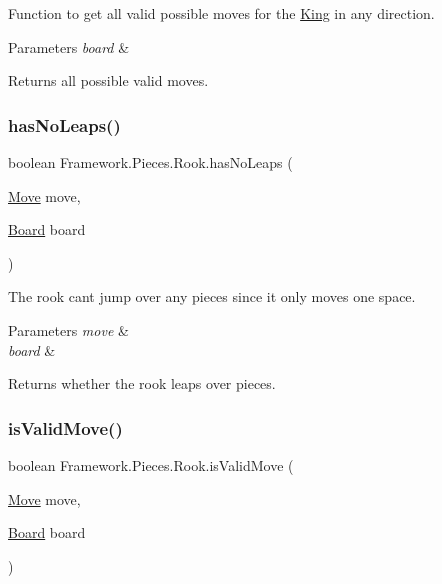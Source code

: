Function to get all valid possible moves for the \hyperlink{class_framework_1_1_pieces_1_1_king}{King} in any direction. 
\begin{DoxyParams}{Parameters}
{\em board} & \\
\hline
\end{DoxyParams}
\begin{DoxyReturn}{Returns}
all possible valid moves. 
\end{DoxyReturn}
\hypertarget{class_framework_1_1_pieces_1_1_rook_a6094de0cab95254ff4bcedd3b35d2079}{}\label{class_framework_1_1_pieces_1_1_rook_a6094de0cab95254ff4bcedd3b35d2079} 
\subsubsection{\texorpdfstring{has\+No\+Leaps()}{hasNoLeaps()}}
{\footnotesize\ttfamily boolean Framework.\+Pieces.\+Rook.\+has\+No\+Leaps (\begin{DoxyParamCaption}\item[{\hyperlink{class_framework_1_1_move}{Move}}]{move,  }\item[{\hyperlink{class_framework_1_1_board}{Board}}]{board }\end{DoxyParamCaption})}

The rook can\textquotesingle{}t jump over any pieces since it only moves one space. 
\begin{DoxyParams}{Parameters}
{\em move} & \\
\hline
{\em board} & \\
\hline
\end{DoxyParams}
\begin{DoxyReturn}{Returns}
whether the rook leaps over pieces. 
\end{DoxyReturn}
\hypertarget{class_framework_1_1_pieces_1_1_rook_a9926099ab216a54a6e441ad198aa611f}{}\label{class_framework_1_1_pieces_1_1_rook_a9926099ab216a54a6e441ad198aa611f} 
\subsubsection{\texorpdfstring{is\+Valid\+Move()}{isValidMove()}}
{\footnotesize\ttfamily boolean Framework.\+Pieces.\+Rook.\+is\+Valid\+Move (\begin{DoxyParamCaption}\item[{\hyperlink{class_framework_1_1_move}{Move}}]{move,  }\item[{\hyperlink{class_framework_1_1_board}{Board}}]{board }\end{DoxyParamCaption})}

